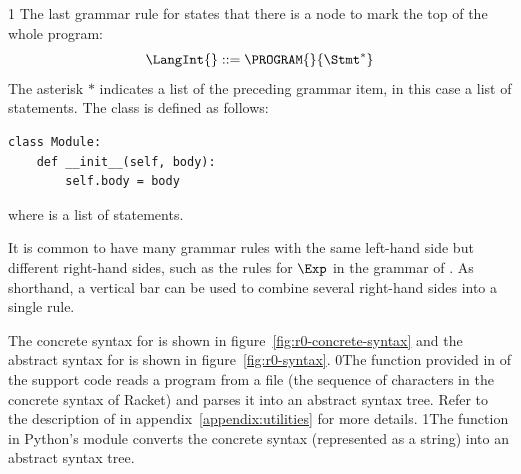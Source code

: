 \documentclass[7x10]{TimesAPriori_MIT}%
\def\racketEd{0}
\def\pythonEd{1}
\def\edition{1}
\newcommand{\racket}[1]{{\if\edition\racketEd{#1}\fi}}
\newcommand{\pythonColor}[0]{}
\newcommand{\python}[1]{{\if\edition\pythonEd\pythonColor #1\fi}}
\numberwithin{theorem}{chapter}
\numberwithin{definition}{chapter}
\numberwithin{equation}{chapter}
\begin{document}
{\if\edition\pythonEd\pythonColor
The last grammar rule for \LangInt{} states that there is a
 node to mark the top of the whole program:
\[
  \LangInt{} ::= \PROGRAM{}{\Stmt^{*}}
\]
The asterisk $*$ indicates a list of the preceding grammar item, in
this case a list of statements.
%
The  class is defined as follows:
\begin{lstlisting}
class Module:
    def __init__(self, body):
        self.body = body
\end{lstlisting}
where  is a list of statements.
\fi}

It is common to have many grammar rules with the same left-hand side
but different right-hand sides, such as the rules for $\Exp$ in the
grammar of \LangInt{}. As shorthand, a vertical bar can be used to
combine several right-hand sides into a single rule.

The concrete syntax for \LangInt{} is shown in
figure~\ref{fig:r0-concrete-syntax} and the abstract syntax for
\LangInt{} is shown in figure~\ref{fig:r0-syntax}.%
%
\racket{The  function provided in
  \code{utilities.rkt} of the support code reads a program from a file
  (the sequence of characters in the concrete syntax of Racket) and
  parses it into an abstract syntax tree. Refer to the description of
  \code{read-program} in appendix~\ref{appendix:utilities} for more
  details.}
%
\python{The  function in Python's  module
  converts the concrete syntax (represented as a string) into an
  abstract syntax tree.}

\newcommand{\LintGrammarRacket}{
  \begin{array}{rcl}
    \Type &::=& \key{Integer} \\
    \Exp{} &::=& \Int{} \MID \CREAD \MID \CNEG{\Exp} \MID \CADD{\Exp}{\Exp}
      \MID \CSUB{\Exp}{\Exp}
  \end{array}
}
\newcommand{\LintASTRacket}{
  \begin{array}{rcl}
    \Type &::=& \key{Integer} \\
    \Exp{} &::=& \INT{\Int} \MID \READ{} \\
           &\MID& \NEG{\Exp} \MID \ADD{\Exp}{\Exp} \MID \SUB{\Exp}{\Exp}
  \end{array}
}
\newcommand{\LintGrammarPython}{
\begin{array}{rcl}
  \Exp &::=& \Int \MID \key{input\_int}\LP\RP \MID \key{-}\;\Exp \MID \Exp \; \key{+} \; \Exp \MID \Exp \; \key{-} \; \Exp \MID \LP\Exp\RP \\
  \Stmt &::=& \key{print}\LP \Exp \RP \MID \Exp
\end{array}
}
\newcommand{\LintASTPython}{
  \begin{array}{rcl}
  \itm{binaryop} &::= & \code{Add()} \MID \code{Sub()} \\
  \itm{unaryop} &::= & \code{USub()} \\
  \Exp{} &::=& \INT{\Int} \MID \READ{} \\
        &\MID& \UNIOP{\itm{unaryop}}{\Exp} \MID  \BINOP{\Exp}{\itm{binaryop}}{\Exp}  \\
  \Stmt{} &::=& \PRINT{\Exp} \MID \EXPR{\Exp} 
\end{array}
}
\end{document}
